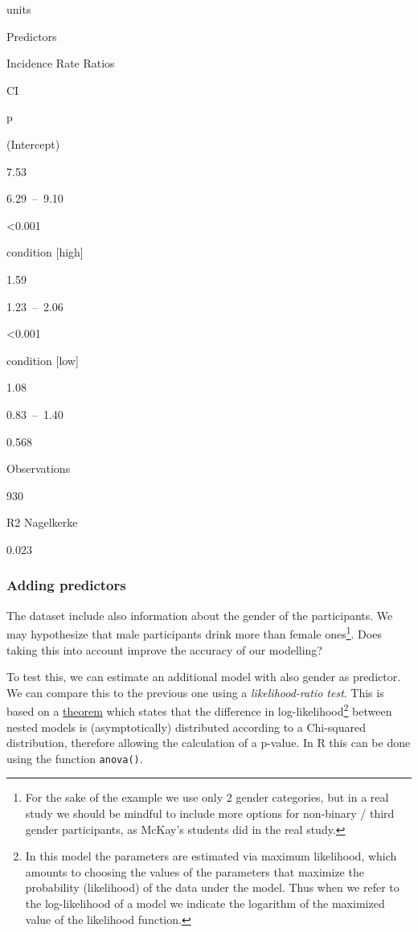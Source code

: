 \documentclass[
]{book}
\begin{document}
units

Predictors

Incidence Rate Ratios

CI

p

(Intercept)

7.53

6.29~--~9.10

\textless0.001

condition {[}high{]}

1.59

1.23~--~2.06

\textless0.001

condition {[}low{]}

1.08

0.83~--~1.40

0.568

Observations

930

R2 Nagelkerke

0.023

\subsubsection{Adding predictors}\label{adding-predictors}

The dataset include also information about the gender of the participants. We may hypothesize that male participants drink more than female ones\footnote{For the sake of the example we use only 2 gender categories, but in a real study we should be mindful to include more options for non-binary / third gender participants, as McKay's students did in the real study.}. Does taking this into account improve the accuracy of our modelling?

To test this, we can estimate an additional model with also gender as predictor. We can compare this to the previous one using a \emph{likelihood-ratio test}. This is based on a \href{https://en.wikipedia.org/wiki/Wilks\%27_theorem}{theorem} which states that the difference in log-likelihood\footnote{In this model the parameters are estimated via maximum likelihood, which amounts to choosing the values of the parameters that maximize the probability (likelihood) of the data under the model. Thus when we refer to the log-likelihood of a model we indicate the logarithm of the maximized value of the likelihood function.} between nested models is (asymptotically) distributed according to a Chi-squared distribution, therefore allowing the calculation of a p-value. In R this can be done using the function \texttt{anova()}.
\end{document}
